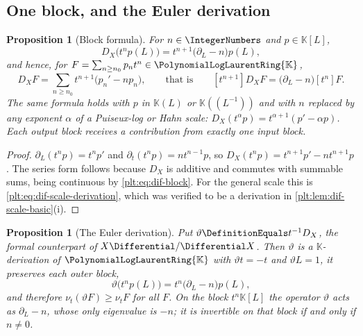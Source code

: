 \documentclass[11pt,oneside]{article}
\theoremstyle{plain}
\newtheorem{proposition}[theorem]{Proposition}
\theoremstyle{definition}
\theoremstyle{remark}
\newcommand{\K}{\mathbb{K}}
\newcommand{\PLlau}{\PolynomialLogLaurentRing{\K}}       %
\newcommand{\ordt}{\nu_{t}}                              %
\newcommand{\DX}{D_{X}}                                  %
\newcommand{\EulerOp}{\vartheta}                         %
\begin{document}
\subsection{One block, and the Euler derivation}
\label{plt:sec:dif-block}

\begin{proposition}[Block formula]\label{plt:prop:dif-block}
For \(n\in\IntegerNumbers\) and \(p\in\K[L]\),
\begin{equation}\label{plt:eq:dif-block}
  \DX\bigl(t^{n}p(L)\bigr)=t^{n+1}\bigl(\partial_{L}-n\bigr)p(L),
\end{equation}
and hence, for \(F=\sum_{n\ge n_{0}}p_{n}t^{n}\in\PLlau\),
\begin{equation}\label{plt:eq:dif-series-derivative}
  \DX F=\sum_{n\ge n_{0}}t^{n+1}\bigl(p_{n}'-np_{n}\bigr),
  \qquad\text{that is}\qquad
  [t^{n+1}]\DX F=\bigl(\partial_{L}-n\bigr)[t^{n}]F .
\end{equation}
The same formula holds with \(p\) in \(\K(L)\) or \(\K((L^{-1}))\) and with
\(n\) replaced by any exponent \(\alpha\) of a Puiseux-log or Hahn scale:
\(\DX(t^{\alpha}p)=t^{\alpha+1}(p'-\alpha p)\).  Each output block receives a
contribution from exactly one input block.
\end{proposition}

\begin{proof}
\(\partial_{L}(t^{n}p)=t^{n}p'\) and \(\partial_{t}(t^{n}p)=nt^{n-1}p\), so
\(\DX(t^{n}p)=t^{n+1}p'-nt^{n+1}p\).  The series form follows because \(\DX\)
is additive and commutes with summable sums, being continuous by
\cref{plt:eq:dif-block}.  For the general scale this is
\cref{plt:eq:dif-scale-derivation}, which was verified to be a derivation in
\cref{plt:lem:dif-scale-basic}(i).
\end{proof}

\begin{proposition}[The Euler derivation]\label{plt:prop:dif-euler}
Put \(\EulerOp\DefinitionEquals t^{-1}\DX\), the formal counterpart of
\(X\Differential/\Differential X\).  Then \(\EulerOp\) is a
\(\K\)-derivation of \(\PLlau\) with \(\EulerOp t=-t\) and \(\EulerOp L=1\),
it preserves each outer block,
\begin{equation}\label{plt:eq:dif-euler-block}
  \EulerOp\bigl(t^{n}p(L)\bigr)=t^{n}\bigl(\partial_{L}-n\bigr)p(L),
\end{equation}
and therefore \(\ordt(\EulerOp F)\ge\ordt F\) for all \(F\).  On the block
\(t^{n}\K[L]\) the operator \(\EulerOp\) acts as \(\partial_{L}-n\), whose only
eigenvalue is \(-n\); it is invertible on that block if and only if
\(n\ne0\).
\end{proposition}
\end{document}
